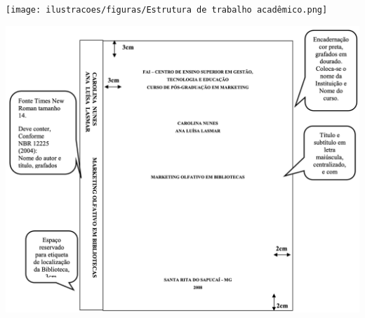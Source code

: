 %
%
%
%


\begin{figura}[h!]
  \centering
  \addfigura
  \texttt{[image: ilustracoes/figuras/Estrutura de trabalho acadêmico.png]}
  \label{figura:EstruturaTrabalhoAcademico}
\end{figura}

\begin{figura}[h!]
  \centering
  \addfigura
  \includegraphics[width=1\textwidth]{ilustracoes/figuras/Modelo de Capa e Lombada.png}
  \label{figura:ModeloDeCapaELombada}
\end{figura}


